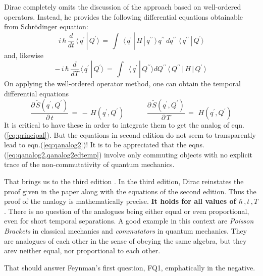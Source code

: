 \documentclass[a4paper]{JHEP3}
\newcommand{\be}{\begin{equation}}
\newcommand{\ee}{\end{equation}}
\begin{document}
Dirac completely omits the discussion of the approach based on well-ordered operators. Instead, he provides the following differential equations
obtainable from Schr\"odinger equation:
\be
\label{eq:qanalog2ed}
i\,\hbar\,\frac{d}{dt}\,\langle\,q^\prime\,|\,Q^\prime\rangle\,=\,\int\,\,\langle\,q^\prime\,|\,H\,|\,q^{\prime\prime}\,\rangle\,q^{\prime\prime}\,
dq^{\prime\prime}\,\,\langle\,q^{\prime\prime}\,|\,Q^\prime\rangle
\ee
and, likewise
\be
\label{eq:qanalog2ed2}
-\,i\,\hbar\,\frac{d}{dT}\,\langle\,q^\prime\,|\,Q^\prime\rangle\,=\,\int\,\,
\,\langle\,q^{\prime}\,|\,Q^{\prime\prime}\rangle
dQ^{\prime\prime}\,
\langle\,Q^{\prime\prime}\,|\,H\,|\,Q^\prime\,\rangle\,
\ee
On applying the well-ordered operator method, one can obtain the temporal differential equations
\be
\label{eq:qanalog2edtemp}
\frac{\partial\,{\tilde S}(q^\prime,Q^\prime)}{\partial\,t}\,=\,-\,H(q^\prime,Q^\prime)\quad\quad\quad\,
\frac{\partial\,{\tilde S}(q^\prime,Q^\prime)}{\partial\,T}\,=\,\,H(q^\prime,Q^\prime)
\ee
It is critical to have these in order to integrate them to get the analog of eqn.(\ref{eq:principal}). But the equations in second edition
do not seem to transparently lead to eqn.(\ref{eq:qanalog2})! It is to be appreciated that the eqns.(\ref{eq:qanalog2,qanalog2edtemp})
involve only commuting objects with no explicit trace of the non-commutativity of quantum mechanics. 

That brings us to the third edition \cite{diracbook3}.
In the third edition, Dirac reinstates the proof given in the paper along with the equations of the second edition. Thus the proof of the 
analogy is mathematically precise. {\bf It holds for all values of $\hbar\,,t\,,T$}. There is no question of the analogues being either
equal or even proportional, even for short temporal separations. A good example in this context are \emph{Poisson Brackets} in classical
mechanics and \emph{commutators} in quantum mechanics. They are analogues of each other in the sense of obeying the same algebra, but
they arev neither equal, nor proportional to each other.

That should answer Feynman's first question, FQ1, emphatically in the negative.
\end{document}
